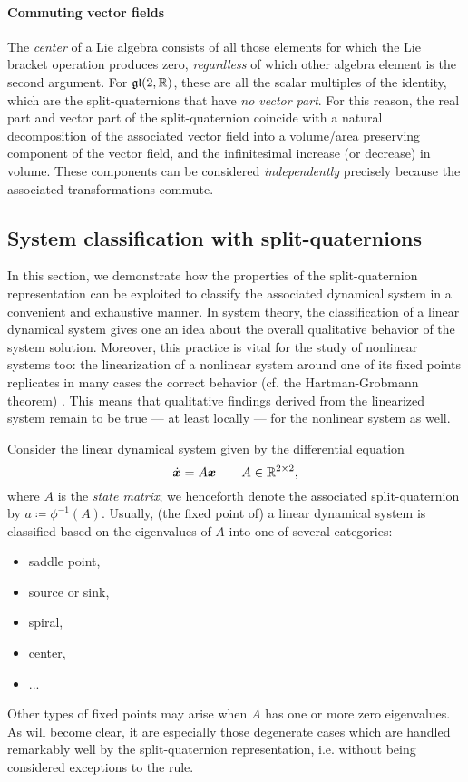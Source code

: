 \paragraph{Commuting vector fields}
The \emph{center} of a Lie algebra consists of all those elements for which the Lie bracket operation produces zero, \emph{regardless} of which other algebra element is the second argument. For $\mathfrak{gl}(2, \mathbb{R})$, these are all the scalar multiples of the identity, which are the split-quaternions that have \emph{no vector part}. For this reason, the real part and vector part of the split-quaternion coincide with a natural decomposition of the associated vector field into a volume/area preserving component of the vector field, and the infinitesimal increase (or decrease) in volume. These components can be considered \emph{independently} precisely because the associated transformations commute.

\subsection{System classification with split-quaternions}
\label{ssec:system_classification}
In this section, we demonstrate how the properties of the split-quaternion representation can be exploited to classify the associated dynamical system in a convenient and exhaustive manner. In system theory, the classification of a linear dynamical system gives one an idea about the overall qualitative behavior of the system solution. Moreover, this practice is vital for the study of nonlinear systems too: the linearization of a nonlinear system around one of its fixed points replicates in many cases the correct behavior (cf. the Hartman-Grobmann theorem) \cite{Khalil2015}. This means that qualitative findings derived from the linearized system remain to be true --- at least locally --- for the nonlinear system as well.

Consider the linear dynamical system given by the differential equation
\begin{equation}
    \dot{\vec{x}} = A\vec{x} \qquad A \in \real^{2\times 2},
    \label{eq:dynamical_system}
\end{equation}
where $A$ is the \emph{state matrix}; we henceforth denote the associated split-quaternion by $a \coloneq \phi^{-1}(A)$. Usually, (the fixed point of) a linear dynamical system is classified based on the eigenvalues of $A$ into one of several categories:
\begin{itemize}[nosep,label=-]
    \item saddle point,
    \item source or sink,
    \item spiral,
    \item center,
    \item ...
\end{itemize}
Other types of fixed points may arise when $A$ has one or more zero eigenvalues. As will become clear, it are especially those degenerate cases which are handled remarkably well by the split-quaternion representation, i.e. without being considered exceptions to the rule.

